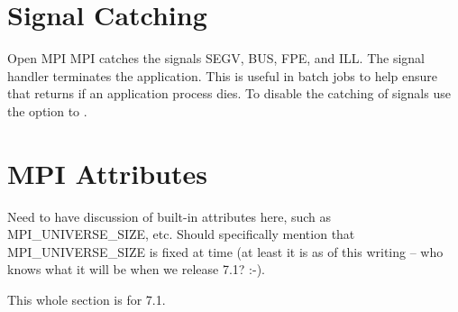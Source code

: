 
\section{Signal Catching}

Open MPI MPI catches the signals SEGV, BUS, FPE, and ILL.  The
signal handler terminates the application. This is useful in batch
jobs to help ensure that  returns if an application
process dies.  To disable the catching of signals use the
 option to .


\section{MPI Attributes}

\begin{discuss}
  Need to have discussion of built-in attributes here, such as
  MPI\_\-UNIVERSE\_\-SIZE, etc.  Should specifically mention that
  MPI\_\-UNIVERSE\_\-SIZE is fixed at  time (at
  least it is as of this writing -- who knows what it will be when we
  release 7.1? :-).

  This whole section is for 7.1.
\end{discuss}
